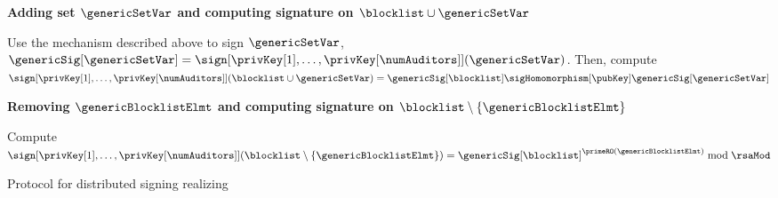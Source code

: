 \begin{figure}[h]
{\begin{minipage}[t]{\textwidth}
\enumListEnd
\enumListEnd

\smallskip\noindent\textbf{Adding set $\genericSetVar$ and computing signature on $\blocklist \cup \genericSetVar$}

\noindent Use the mechanism described above to sign $\genericSetVar$, $\genericSig[\genericSetVar] = \sign[\privKey[1],  \dots, \privKey[\numAuditors]](\genericSetVar)$.  Then, compute $\sign[\privKey[1],  \dots, \privKey[\numAuditors]](\blocklist \cup \genericSetVar) = \genericSig[\blocklist] \sigHomomorphism[\pubKey] \genericSig[\genericSetVar]$ 

\smallskip\noindent\textbf{Removing $\genericBlocklistElmt$ and computing signature on $\blocklist \setminus \{ \genericBlocklistElmt \}$}

\noindent Compute $\sign[\privKey[1],  \dots, \privKey[\numAuditors]](\blocklist \setminus \{\genericBlocklistElmt \}) = \genericSig[\blocklist]^{\primeRO(\genericBlocklistElmt)} \bmod \rsaMod$ 



\end{minipage}
}
\caption{Protocol for distributed signing realizing \distSigningFunc\label{fig:protocol:dist_sign}}
\end{figure}